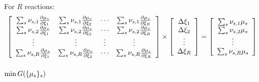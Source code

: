 For $R$ reactions:
\begin{equation}
\left[\begin{array}{cccc}
\sum_s\scoef[s,1]\doverdext[1]{\chempot[s]} & \sum_s\scoef[s,1]\doverdext[2]{\chempot[s]} & \cdots & \sum_s\scoef[s,1]\doverdext[R]{\chempot[s]}\\
\sum_s\scoef[s,2]\doverdext[1]{\chempot[s]} & \sum_s\scoef[s,2]\doverdext[2]{\chempot[s]} & \cdots & \sum_s\scoef[s,2]\doverdext[R]{\chempot[s]}\\
\vdots &\vdots &\vdots &\vdots \\
\sum_s\scoef[s,R]\doverdext[1]{\chempot[s]} & \sum_s\scoef[s,R]\doverdext[2]{\chempot[s]} & \cdots & \sum_s\scoef[s,R]\doverdext[R]{\chempot[s]}\\
\end{array}\right]
\times
\left[\begin{array}{c}
\Delta\ext[1] \\
\Delta\ext[2] \\
\vdots \\ 
\Delta\ext[R]
\end{array}\right]
=
\left[\begin{array}{c}
\sum_s \scoef[s,1] \chempot[s] \\ 
\sum_s \scoef[s,2] \chempot[s] \\ 
\vdots \\ 
\sum_s \scoef[s,R] \chempot[s]
\end{array}\right]
\end{equation}

\subsubsection{\texorpdfstring{$\min\Gibbs(\{\chempot[s]\}_s)$}{Phase enthalpy minimization}}

